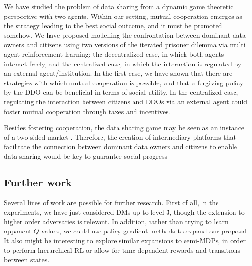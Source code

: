 
We have studied the problem of data sharing
from a dynamic game theoretic perspective with two agents.
Within our setting,  mutual cooperation emerges as the strategy 
leading to the best social outcome, and it must be promoted somehow. We
have proposed modelling the confrontation between dominant data owners and citizens using two versions of the iterated prisoner dilemma via  
multi agent reinforcement learning: the decentralized case, in which both agents interact freely, and the centralized case, in which the interaction is regulated by an external agent/institution. In the first case, we have shown that there are strategies with which mutual cooperation is possible, and that a forgiving policy by the DDO can be beneficial in terms of social utility. In the centralized case, regulating the interaction between citizens and DDOs via an external agent could foster mutual cooperation through taxes and incentives.

 Besides fostering cooperation,  the data sharing game may be seen as
  an instance of a two sided market \parencite{rochet2006two}. Therefore,
  the creation of intermediary platforms that facilitate the connection between dominant data owners and citizens to enable data sharing
  would be key to guarantee social progress. 
  

\subsection{Further work}

Several lines of work are possible for further research. First of all, in the experiments, we have just considered DMs up to level-3,
though the extension to higher order adversaries is relevant. %
In addition, rather than trying to learn opponent $Q$-values, we could
use policy gradient methods \parencite{baxter2000direct} to expand our proposal.
It also might be interesting to explore similar expansions to semi-MDPs, 
in order to perform hierarchical RL or allow for time-dependent rewards 
and transitions between states.